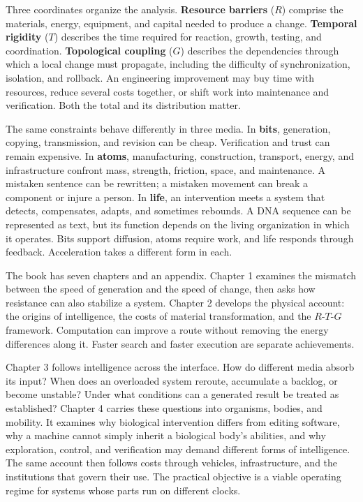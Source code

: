 \documentclass[11pt,openany]{book}
\newcommand{\term}[1]{\textbf{#1}}
\begin{document}
Three coordinates organize the analysis. \term{Resource barriers} ($R$) comprise the materials, energy, equipment, and capital needed to produce a change. \term{Temporal rigidity} ($T$) describes the time required for reaction, growth, testing, and coordination. \term{Topological coupling} ($G$) describes the dependencies through which a local change must propagate, including the difficulty of synchronization, isolation, and rollback. An engineering improvement may buy time with resources, reduce several costs together, or shift work into maintenance and verification. Both the total and its distribution matter.

The same constraints behave differently in three media. In \term{bits}, generation, copying, transmission, and revision can be cheap. Verification and trust can remain expensive. In \term{atoms}, manufacturing, construction, transport, energy, and infrastructure confront mass, strength, friction, space, and maintenance. A mistaken sentence can be rewritten; a mistaken movement can break a component or injure a person. In \term{life}, an intervention meets a system that detects, compensates, adapts, and sometimes rebounds. A DNA sequence can be represented as text, but its function depends on the living organization in which it operates. Bits support diffusion, atoms require work, and life responds through feedback. Acceleration takes a different form in each.

The book has seven chapters and an appendix. Chapter 1 examines the mismatch between the speed of generation and the speed of change, then asks how resistance can also stabilize a system. Chapter 2 develops the physical account: the origins of intelligence, the costs of material transformation, and the $R$-$T$-$G$ framework. Computation can improve a route without removing the energy differences along it. Faster search and faster execution are separate achievements.

Chapter 3 follows intelligence across the interface. How do different media absorb its input? When does an overloaded system reroute, accumulate a backlog, or become unstable? Under what conditions can a generated result be treated as established? Chapter 4 carries these questions into organisms, bodies, and mobility. It examines why biological intervention differs from editing software, why a machine cannot simply inherit a biological body's abilities, and why exploration, control, and verification may demand different forms of intelligence. The same account then follows costs through vehicles, infrastructure, and the institutions that govern their use. The practical objective is a viable operating regime for systems whose parts run on different clocks.
\end{document}
